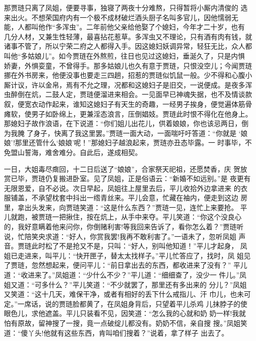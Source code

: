 那贾琏只离了凤姐，便要寻事，独寝了两夜十分难熬，只得暂将小厮内清俊的
选来出火。不想荣国府内有一个极不成材破烂酒头厨子名叫多官儿，因他懦弱无
能，人都叫他作“多浑虫”。二年前他父亲给他娶了个媳妇，今年才二十岁，也有
几分人材，又兼生性轻薄，最喜拈花惹草。多浑虫又不理论，只有酒有肉有钱，就
诸事不管了，所以宁荣二府之人都得入手。因这媳妇妖调异常，轻狂无比，众人都
叫他“多姑娘儿”。如今贾琏在外熬煎，往日也见过这媳妇，垂涎久了，只是内惧
娇妻，外惧娈童，不曾得手。那多姑娘儿也久有意于贾琏，只恨没空儿；今闻贾琏
挪在外书房来，他便没事也要走三四趟，招惹的贾琏似饥鼠一般。少不得和心腹小
厮计议，许以金帛，焉有不允之理，况都和这媳妇子是旧交，一说便成。是夜多浑
虫醉倒在炕，二鼓人定，贾琏便溜进来相会。一见面早已神魂失据，也不及情谈款
叙，便宽衣动作起来，谁知这媳妇子有天生的奇趣，一经男子挨身，便觉遍体筋骨
瘫软，使男子如卧绵上，更兼淫态浪言，压倒娼妓。贾琏此时恨不得化在他身上。
那媳妇子故作浪语，在下说道：“你们姐儿出花儿，供着娘娘，你也该忌两日，倒
为我腌了身子，快离了我这里罢。”贾琏一面大动，一面喘吁吁答道：“你就是
‘娘娘’!那里还管什么‘娘娘’呢！”那媳妇子越浪起来，贾琏亦丑态毕露。一
时事毕，不免盟山誓海，难舍难分。自此后，遂成相契。

一日，大姐毒尽癍回，十二日后送了“娘娘”，合家祭天祀祖，还愿焚香，庆
贺放赏已毕，贾琏仍复搬进卧室。见了凤姐，正是俗语云：“新婚不如远别。”是
夜更有无限恩爱，自不必说。次日早起，凤姐往上屋里去后，平儿收拾外边拿进来
的衣服铺盖，不承望枕套中抖出一绺青丝来。平儿会意，忙藏在袖内，便走到这边
房里，拿出头发来，向贾琏笑道：“这是什么东西？”贾琏一见，连忙上来要抢。
平儿就跑，被贾琏一把揪住，按在炕上，从手中来夺。平儿笑道：“你这个没良心
的，我好意瞒着他来问你，你倒赌利害!等我回来告诉了，看你怎么着？”贾琏听
说，忙陪笑央求道：“好人，你赏我罢!我再不敢利害了。”一语未了，忽听凤姐
声音。贾琏此时松了不是抢又不是，只叫：“好人，别叫他知道！”平儿才起身，
凤姐已走进来，叫平儿：“快开匣子，替太太找样子。”平儿忙答应了，找时，凤
姐见了贾琏，忽然想起来，便问平儿：“前日拿出去的东西，都收进来了没有？”
平儿道：“收进来了。”凤姐道：“少什么不少？”平儿道：“细细查了，没少一
件儿。”凤姐又道：“可多什么？”平儿笑道：“不少就罢了，那里还有多出来的
分儿？”凤姐又笑道：“这十几天，难保干净，或者有相好的丢下什么戒指儿、汗
巾儿，也未可定。”一席话，说的贾琏脸都黄了，在凤姐身背后，只望着平儿杀鸡
儿抹脖子的使眼色儿，求他遮盖。平儿只装看不见，因笑道：“怎么我的心就和奶
奶一样!我就怕有原故，留神搜了一搜，竟一点破绽儿都没有。奶奶不信，亲自搜
搜。”凤姐笑道：“傻丫头!他就有这些东西，肯叫咱们搜着？”说着，拿了样子
出去了。

